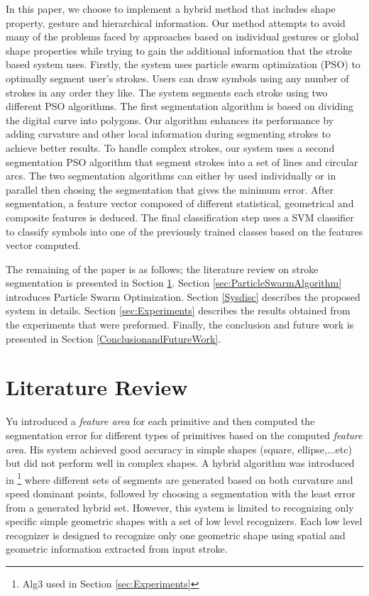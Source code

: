 \documentclass[preprint,10pt,5p,twocolumn]{elsarticle}
\begin{document}
In this paper, we choose to implement a hybrid method that includes shape property, gesture and hierarchical information. Our method attempts to avoid many of the problems faced by approaches based on individual gestures or global shape properties while trying to gain the additional information that the stroke based system uses. Firstly, the system uses particle swarm optimization (PSO) to optimally segment user's strokes. Users can draw symbols using any number of strokes in any order they like. The system segments each stroke using two different PSO algorithms. The first segmentation algorithm is based on dividing the digital curve into polygons\cite{PolygonApproximationPSO}. Our algorithm enhances its performance by adding curvature and other local information during segmenting strokes to achieve better results. To handle complex strokes, our system uses a second segmentation PSO algorithm that segment strokes into a set of lines and circular arcs. The two segmentation algorithms can either by used  individually or in parallel then chosing the segmentation that gives the minimum error. After segmentation, a feature vector composed of different statistical, geometrical and composite features is deduced. The final classification step uses a SVM classifier to classify symbols into one of the previously trained classes based on the features vector computed.


 The remaining of the paper is as follows; the literature review on stroke segmentation is presented in Section \ref{sec:review}. Section \ref{sec:ParticleSwarmAlgorithm} introduces Particle Swarm Optimization. Section \ref{Sysdisc} describes the proposed system in details. Section \ref{sec:Experiments} describes the results obtained from the experiments that were preformed. Finally, the conclusion and future work is presented in Section \ref{ConclusionandFutureWork}.  

\section{Literature Review}
\label{sec:review}

Yu \cite{meanshift10} introduced a \textit{feature area} for each primitive and then computed the segmentation error for different types of primitives based on the computed \textit{feature area}. His system achieved good accuracy in simple shapes (square, ellipse,...etc) but did not perform well in complex shapes. A hybrid algorithm was introduced in \cite{earlyprocess}\footnote{Alg3 used in Section \ref{sec:Experiments} } where different sets of segments are generated based on both curvature and speed dominant points, followed by choosing a segmentation with the least error from a generated hybrid set. However, this system is limited to recognizing only specific simple geometric shapes with a set of low level recognizers. Each low level recognizer is designed to recognize only one geometric shape using spatial and geometric information extracted from input stroke. 
\end{document}
